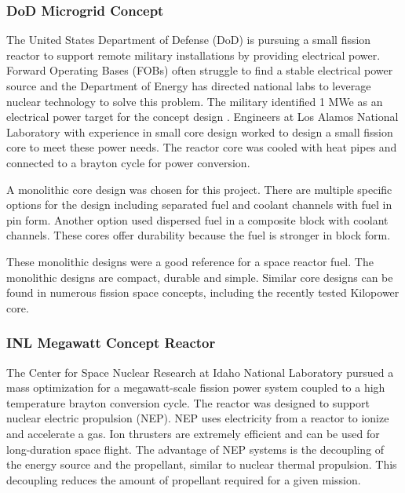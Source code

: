     \subsubsection{DoD Microgrid Concept}
    The United States Department of Defense (DoD) is pursuing a small fission
    reactor to support remote military installations by providing electrical
    power. Forward Operating Bases (FOBs) often struggle to find a stable
    electrical power source and the Department of Energy has directed national
    labs to leverage nuclear technology to solve this problem. The military
    identified 1 MWe as an electrical power target for the concept design
    \citep{army_reactor_slides}.
    Engineers at Los Alamos National Laboratory with experience in small core
    design worked to design a small fission core to meet these power needs. The
    reactor core was cooled with heat pipes and connected to a brayton cycle for
    power conversion.

    A monolithic core design was chosen for this project. There are multiple
    specific options for the design including separated fuel and coolant
    channels with fuel in pin form. Another option used dispersed fuel in a
    composite block with coolant channels. These cores offer durability because
    the fuel is stronger in block form.

    These monolithic designs were a good reference for a space reactor fuel.
    The monolithic designs are compact, durable and simple. Similar core designs
    can be found in numerous fission space concepts, including the recently
    tested Kilopower core.

    \subsubsection{INL Megawatt Concept Reactor}
    The Center for Space Nuclear Research at Idaho National Laboratory pursued a
    mass optimization for a megawatt-scale fission power system coupled to a
    high temperature brayton conversion cycle. The reactor was designed to
    support nuclear electric propulsion (NEP). NEP uses electricity from a
    reactor to ionize and accelerate a gas. Ion thrusters are extremely
    efficient and can be used for long-duration space flight. The advantage of
    NEP systems is the decoupling of the energy source and the propellant,
    similar to nuclear thermal propulsion. This decoupling reduces the amount of
    propellant required for a given mission.
    
